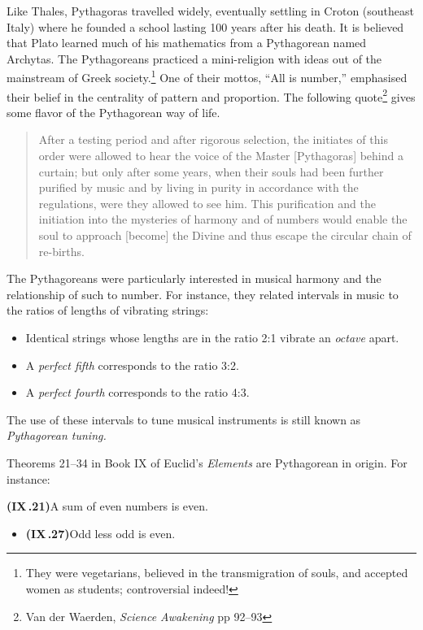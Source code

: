 Like Thales, Pythagoras travelled widely, eventually settling in Croton (southeast Italy) where he founded a school lasting 100 years after his death. It is believed that Plato learned much of his mathematics from a Pythagorean named Archytas.\smallbreak
The Pythagoreans practiced a mini-religion with ideas out of the mainstream of Greek society.\footnote{They were vegetarians, believed in the transmigration of souls, and accepted women as students; controversial indeed!} One of their mottos, ``All is number,'' emphasised their belief in the centrality of pattern and proportion. The following quote\footnote{Van der Waerden, \emph{Science Awakening} pp 92--93} gives some flavor of the Pythagorean way of life.
\begin{quote}
  After a testing period and after rigorous selection, the initiates of this order were allowed to hear the voice of the Master [Pythagoras] behind a curtain; but only after some years, when their souls had been further purified by music and by living in purity in accordance with the regulations, were they allowed to see him. This purification and the initiation into the mysteries of harmony and of numbers would enable the soul to approach [become] the Divine and thus escape the circular chain of re-births.
\end{quote}

The Pythagoreans were particularly interested in musical harmony and the relationship of such to number. For instance, they related intervals in music to the ratios of lengths of vibrating strings:\vspace{-3pt}
\begin{itemize}\itemsep0pt\label{pg:pythagtuning}
  \item Identical strings whose lengths are in the ratio 2:1 vibrate an \emph{octave} apart.
  \item A \emph{perfect fifth} corresponds to the ratio 3:2.
  \item A \emph{perfect fourth} corresponds to the ratio 4:3.
\end{itemize}\vspace{-3pt}
The use of these intervals to tune musical instruments is still known as \emph{Pythagorean tuning.}\smallbreak\goodbreak

Theorems 21--34 in Book IX of Euclid's \emph{Elements} are Pythagorean in origin. For instance:

\begin{thm*}{}{}
  {\normalfont\textbf{(IX\,.21)}}\lstsp A sum of even numbers is even.\par\vspace{-8pt}
  \begin{itemize}
    \item[]{\normalfont\textbf{(IX\,.27)}}\lstsp Odd less odd is even.
  \end{itemize}
\end{thm*}


